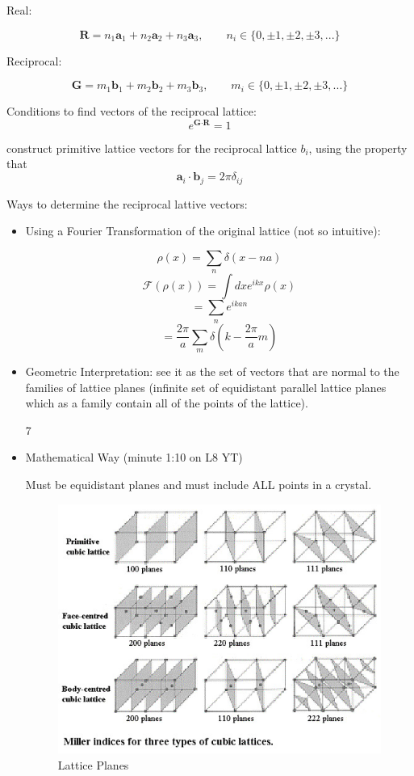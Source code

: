 Real:

\[ \textbf{R} = n_1\textbf{a}_1 + n_2\textbf{a}_2 + n_3\textbf{a}_3, \qquad n_i \in  \{0,\pm1, \pm2, \pm3, ...\} \]
 
 Reciprocal:

\[ \textbf{G} = m_1\textbf{b}_1 + m_2\textbf{b}_2 + m_3\textbf{b}_3, \qquad m_i \in  \{0,\pm1, \pm2, \pm3, ...\} \]


Conditions to find vectors of the reciprocal lattice:
\begin{equation}
    e^{\textbf{G}\cdot \textbf{R}} = 1
\end{equation}

construct primitive lattice vectors for the reciprocal lattice \textbf{$b_i$}, using the property that
\begin{equation}
    \textbf{a}_i \cdot \textbf{b}_j = 2 \pi \delta_{ij}
\end{equation}


Ways to determine the reciprocal lattive vectors:
\begin{itemize}
    \item Using a Fourier Transformation of the original lattice (not so intuitive):

\[\rho(x) = \sum_{n} \delta(x-na)\]
\[\mathcal{F}(\rho(x))= \int dx e^{ikx} \rho(x)\]
\[= \sum_n e^{ikan} \]
\[=\frac{2\pi}{a} \sum_m \delta \left(k-\frac{2\pi}{a}m\right) \]


\item Geometric Interpretation: see it as the set of vectors that are normal to the families of lattice planes (infinite set of equidistant parallel lattice planes which as a family contain all of the points of the lattice).

7\item Mathematical Way (minute 1:10 on L8 YT)

Must be equidistant planes and must include ALL points in a crystal.

\pagebreak


\begin{figure}
  \centering
  \includegraphics[width=0.6\linewidth]{Images/latticeplanes.jpg}
  \caption{Lattice Planes}
  \label{fig:Lattice Planes}
\end{figure}



\end{itemize}


